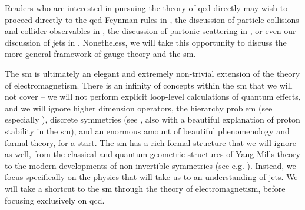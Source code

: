 Readers who are interested in pursuing the theory of \gls{qcd} directly may wish to proceed directly to the \gls{qcd} Feynman rules in , the discussion of particle collisions and collider observables in , the discussion of partonic scattering in , or even our discussion of jets in .
%
Nonetheless, we will take this opportunity to discuss the more general framework of gauge theory and the \gls{sm}.


The \gls{sm} is ultimately an elegant and extremely non-trivial extension of the theory of electromagnetism.
%
There is an infinity of concepts within the \gls{sm} that we will not cover -- we will not perform explicit loop-level calculations of quantum effects, and we will ignore higher dimension operators, the hierarchy problem (see especially ), discrete  symmetries (see , also with a beautiful explanation of proton stability in the \gls{sm}), and an enormous amount of beautiful phenomenology and formal theory, for a start.
%
The \gls{sm} has a rich formal structure that we will ignore as well, from the classical and quantum geometric structures of Yang-Mills theory to the modern developments of non-invertible symmetries (see e.g. ).
%
Instead, we focus specifically on the physics that will take us to an understanding of jets.
%
We will take a shortcut to the \gls{sm} through the theory of electromagnetism, before focusing exclusively on \gls{qcd}.



